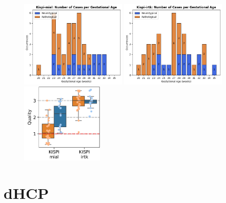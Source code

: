 \begin{figure}[htbp]
    \centering
    \includegraphics[width=0.45\textwidth]{figures/k-mial_GA.png} \quad
    \includegraphics[width=0.45\textwidth]{figures/k-irtk_GA.png}\\
    \vspace{10pt}
    \includegraphics[width=0.35\textwidth]{figures/kispi_quality.png}
    \caption{}
    \label{fig:kispi_plots}
\end{figure}

\section{dHCP}

